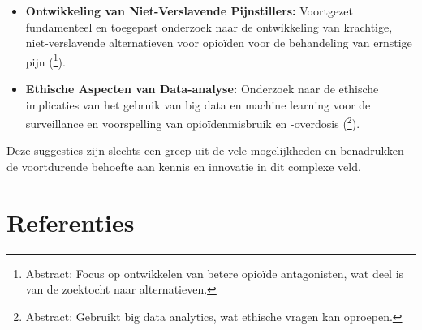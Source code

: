 \documentclass[11pt, a4paper]{report} %
\begin{document}
\begin{itemize}
    \item \textbf{Ontwikkeling van Niet-Verslavende Pijnstillers:} Voortgezet fundamenteel en toegepast onderzoek naar de ontwikkeling van krachtige, niet-verslavende alternatieven voor opioïden voor de behandeling van ernstige pijn (\cite{Deng2020TowardsBetterOpioidAntagonistsRL}\footnote{Abstract: Focus op ontwikkelen van betere opioïde antagonisten, wat deel is van de zoektocht naar alternatieven.}).
    \item \textbf{Ethische Aspecten van Data-analyse:} Onderzoek naar de ethische implicaties van het gebruik van big data en machine learning voor de surveillance en voorspelling van opioïdenmisbruik en -overdosis (\cite{Hasan2019BigDataOpioidRisk}\footnote{Abstract: Gebruikt big data analytics, wat ethische vragen kan oproepen.}).
\end{itemize}
Deze suggesties zijn slechts een greep uit de vele mogelijkheden en benadrukken de voortdurende behoefte aan kennis en innovatie in dit complexe veld.
\pagebreak
\chapter{Referenties}
\end{document}
